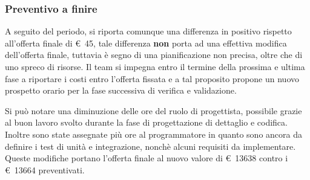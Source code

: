     \subsubsection{Preventivo a finire}
        A seguito del periodo, si riporta comunque una differenza in positivo rispetto all'offerta finale di \euro\ 45,
        tale differenza \textbf{non} porta ad una effettiva modifica dell'offerta finale, tuttavia è segno di una pianificazione non precisa,
        oltre che di uno spreco di risorse.
        Il team si impegna entro il termine della prossima e ultima fase a riportare i costi entro l'offerta fissata e a tal proposito propone
        un nuovo prospetto orario per la fase successiva di verifica e validazione.
        \def\salarycontent{
            {Amministratore,16,20,320},
            {Analista,0,25,0},
            {Progettista,$48-\noexpand\textbf{8}$,22,880},
            {Programmatore,$43+\noexpand\textbf{7}$,15,750},
            {Responsabile,15,30,450},
            {Verificatore,60,15,900},
            {Totale,176,127,$3371-\noexpand\textbf{71} = 3300 $ },
        }
        
        Si può notare una diminuzione delle ore del ruolo di progettista, possibile grazie
        al buon lavoro svolto durante la fase di progettazione di dettaglio e codifica.
        Inoltre sono state assegnate più ore al programmatore in quanto sono ancora da definire
        i test di unità e integrazione, nonchè alcuni requisiti da implementare. \\
        \noindent Queste modifiche portano l'offerta finale al nuovo valore di \euro\ 13638 contro
        i \euro\ 13664 preventivati. 
